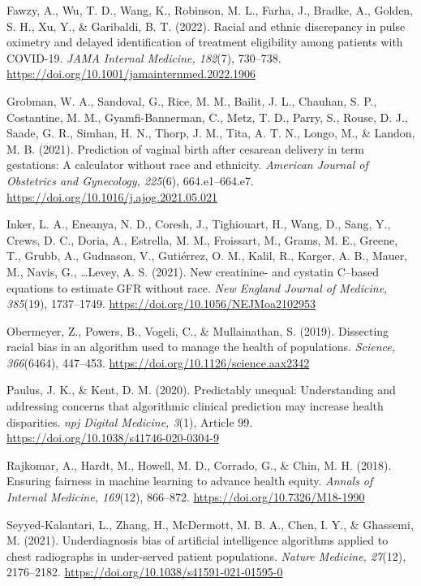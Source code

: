 \documentclass[12pt]{article}
\begin{document}
Fawzy, A., Wu, T. D., Wang, K., Robinson, M. L., Farha, J., Bradke, A., Golden, S. H., Xu, Y., \& Garibaldi, B. T. (2022). Racial and ethnic discrepancy in pulse oximetry and delayed identification of treatment eligibility among patients with COVID-19. \emph{JAMA Internal Medicine, 182}(7), 730--738. \url{https://doi.org/10.1001/jamainternmed.2022.1906}

Grobman, W. A., Sandoval, G., Rice, M. M., Bailit, J. L., Chauhan, S. P., Costantine, M. M., Gyamfi-Bannerman, C., Metz, T. D., Parry, S., Rouse, D. J., Saade, G. R., Simhan, H. N., Thorp, J. M., Tita, A. T. N., Longo, M., \& Landon, M. B. (2021). Prediction of vaginal birth after cesarean delivery in term gestations: A calculator without race and ethnicity. \emph{American Journal of Obstetrics and Gynecology, 225}(6), 664.e1--664.e7. \url{https://doi.org/10.1016/j.ajog.2021.05.021}

Inker, L. A., Eneanya, N. D., Coresh, J., Tighiouart, H., Wang, D., Sang, Y., Crews, D. C., Doria, A., Estrella, M. M., Froissart, M., Grams, M. E., Greene, T., Grubb, A., Gudnason, V., Guti\'errez, O. M., Kalil, R., Karger, A. B., Mauer, M., Navis, G., \ldots Levey, A. S. (2021). New creatinine- and cystatin C--based equations to estimate GFR without race. \emph{New England Journal of Medicine, 385}(19), 1737--1749. \url{https://doi.org/10.1056/NEJMoa2102953}

Obermeyer, Z., Powers, B., Vogeli, C., \& Mullainathan, S. (2019). Dissecting racial bias in an algorithm used to manage the health of populations. \emph{Science, 366}(6464), 447--453. \url{https://doi.org/10.1126/science.aax2342}

Paulus, J. K., \& Kent, D. M. (2020). Predictably unequal: Understanding and addressing concerns that algorithmic clinical prediction may increase health disparities. \emph{npj Digital Medicine, 3}(1), Article 99. \url{https://doi.org/10.1038/s41746-020-0304-9}

Rajkomar, A., Hardt, M., Howell, M. D., Corrado, G., \& Chin, M. H. (2018). Ensuring fairness in machine learning to advance health equity. \emph{Annals of Internal Medicine, 169}(12), 866--872. \url{https://doi.org/10.7326/M18-1990}

Seyyed-Kalantari, L., Zhang, H., McDermott, M. B. A., Chen, I. Y., \& Ghassemi, M. (2021). Underdiagnosis bias of artificial intelligence algorithms applied to chest radiographs in under-served patient populations. \emph{Nature Medicine, 27}(12), 2176--2182. \url{https://doi.org/10.1038/s41591-021-01595-0}
\end{document}
